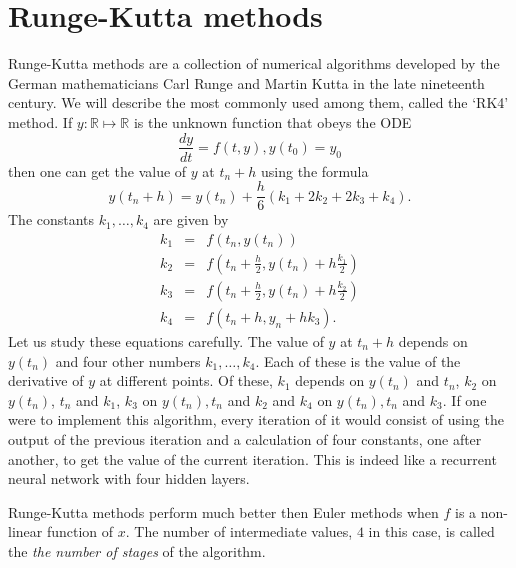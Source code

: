 \documentclass{article}
\numberwithin{equation}{section}
\begin{document}
\section{Runge-Kutta methods}\label{s6}
Runge-Kutta methods are a collection of numerical algorithms developed by
the German mathematicians Carl Runge and Martin Kutta in the late 
nineteenth century\cite{lambert1991numerical}. We will describe the most
commonly used among them, called the `RK4' method. If $y: \mathbb{R}
\mapsto \mathbb{R}$ is the unknown function that obeys the ODE
\begin{equation}\label{s6e1}
\frac{dy}{dt} = f(t, y), y(t_0) = y_0
\end{equation}
then one can get the value of $y$ at $t_n + h$ using the formula
\begin{equation}\label{s6e2}
y(t_n + h) = y(t_n) + \frac{h}{6}(k_1 + 2k_2 + 2k_3 + k_4).
\end{equation}
The constants $k_1, \ldots, k_4$ are given by
\begin{eqnarray}
k_1 &=& f(t_n, y(t_n)) \label{s6e3} \\
k_2 &=& f\left(t_n + \frac{h}{2}, y(t_n) + h\frac{k_1}{2}\right) 
 \label{s6e4} \\
k_3 &=& f\left(t_n + \frac{h}{2}, y(t_n) + h\frac{k_2}{2}\right) 
 \label{s6e5} \\
k_4 &=& f(t_n + h, y_n + hk_3). \label{s6e6}
\end{eqnarray}
Let us study these equations carefully. The value of $y$ at $t_n + h$ 
depends on $y(t_n)$ and four other numbers $k_1, \ldots, k_4$. Each of
these is the value of the derivative of $y$ at different points. Of these,
$k_1$ depends on $y(t_n)$ and $t_n$, $k_2$ on $y(t_n)$, $t_n$ and $k_1$,
$k_3$ on $y(t_n), t_n$ and $k_2$ and $k_4$ on $y(t_n), t_n$ and $k_3$. If
one were to implement this algorithm, every iteration of it would consist
of using the output of the previous iteration and a calculation of four
constants, one after another, to get the value of the current iteration.
This is indeed like a recurrent neural network with four hidden layers.

Runge-Kutta methods perform much better then Euler methods when $f$ is 
a non-linear function of $x$. The number of intermediate values, $4$ in 
this case, is called the \emph{the number of stages} of the algorithm.
\end{document}
